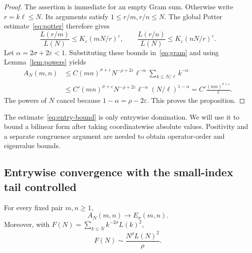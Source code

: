 \begin{proof}
The assertion is immediate for an empty Gram sum. Otherwise write
$r=k\ell\le N$. Its arguments satisfy $1\le r/m,r/n\le N$.
The global Potter estimate~\eqref{eq:potter} therefore gives
\begin{equation}
 \frac{L(r/m)}{L(N)}\le K_\varepsilon(mN/r)^\varepsilon,
 \qquad
 \frac{L(r/n)}{L(N)}\le K_\varepsilon(nN/r)^\varepsilon.
 \label{eq:two-potter}
\end{equation}
Let $\alpha=2\sigma+2\varepsilon<1$. Substituting these bounds
in~\eqref{eq:gram} and using Lemma~\ref{lem:powers} yields
\begin{align*}
 A_N(m,n)
 &\le C(mn)^{\sigma+\varepsilon}N^{-\rho+2\varepsilon}
      \ell^{-\alpha}\sum_{k\le N/\ell}k^{-\alpha}\\
 &\le C'(mn)^{\sigma+\varepsilon}N^{-\rho+2\varepsilon}
      \ell^{-\alpha}(N/\ell)^{1-\alpha}
 =C'\frac{(mn)^{\sigma+\varepsilon}}{\ell}.
\end{align*}
The powers of $N$ cancel because $1-\alpha=\rho-2\varepsilon$.
This proves the proposition.
\end{proof}

The estimate~\eqref{eq:entry-bound} is only entrywise domination.
We will use it to bound a bilinear form after taking coordinatewise
absolute values. Positivity and a separate congruence argument are
needed to obtain operator-order and eigenvalue bounds.

\subsection{Entrywise convergence with the small-index tail controlled}

\begin{proposition}
\label{prop:entry-limit}
For every fixed pair $m,n\ge1$,
\begin{equation}
 A_N(m,n)\longrightarrow E_\sigma(m,n).
 \label{eq:entry-limit}
\end{equation}
Moreover, with $F(N)=\sum_{k\le N}k^{-2\sigma}L(k)^2$,
\begin{equation}
 F(N)\sim\frac{N^\rho L(N)^2}{\rho}.
 \label{eq:energy}
\end{equation}
\end{proposition}


